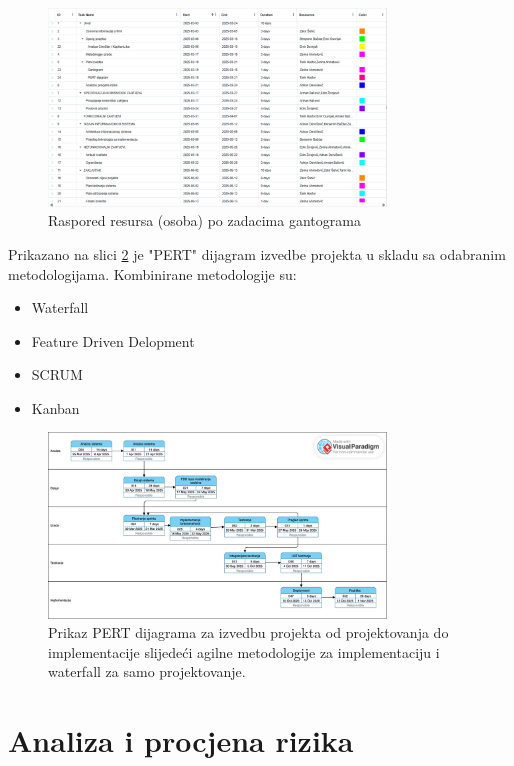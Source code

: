 \begin{figure}[H]
    \centering
    \includegraphics[width=0.8\textwidth]{Slike/gant-opis.png}
    \caption{Raspored resursa (osoba) po zadacima gantograma}
    \label{fig:pi2}
\end{figure}


Prikazano na slici \ref{fig:pi3} je "PERT" dijagram izvedbe projekta u skladu sa odabranim metodologijama. Kombinirane metodologije su:
\begin{itemize}
    \item Waterfall
    \item Feature Driven Delopment
    \item SCRUM
    \item Kanban
\end{itemize}
\begin{figure}[H]
    \centering
    \includegraphics[width=0.8\textwidth]{Slike/PERT.png}
    \caption{Prikaz PERT dijagrama za izvedbu projekta od projektovanja do implementacije slijedeći agilne metodologije za implementaciju i waterfall za samo projektovanje.}
    \label{fig:pi3} %
\end{figure}
\newpage
\sloppy
\section{Analiza i procjena rizika}

